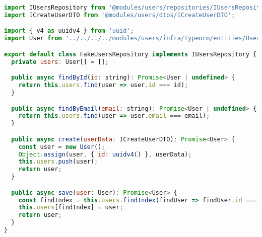 \begin{lstlisting}[language=JavaScript, caption={FakeUsersRepository.ts},captionpos=b, label=alg:fakeusersrepository]
import IUsersRepository from '@modules/users/repositories/IUsersRepository';
import ICreateUserDTO from '@modules/users/dtos/ICreateUserDTO';

import { v4 as uuidv4 } from 'uuid';
import User from '../../../../modules/users/infra/typeorm/entities/User';

export default class FakeUsersRepository implements IUsersRepository {
  private users: User[] = [];

  public async findById(id: string): Promise<User | undefined> {
    return this.users.find(user => user.id === id);
  }

  public async findByEmail(email: string): Promise<User | undefined> {
    return this.users.find(user => user.email === email);
  }

  public async create(userData: ICreateUserDTO): Promise<User> {
    const user = new User();
    Object.assign(user, { id: uuidv4() }, userData);
    this.users.push(user);
    return user;
  }

  public async save(user: User): Promise<User> {
    const findIndex = this.users.findIndex(findUser => findUser.id === user.id);
    this.users[findIndex] = user;
    return user;
  }
}
\end{lstlisting}